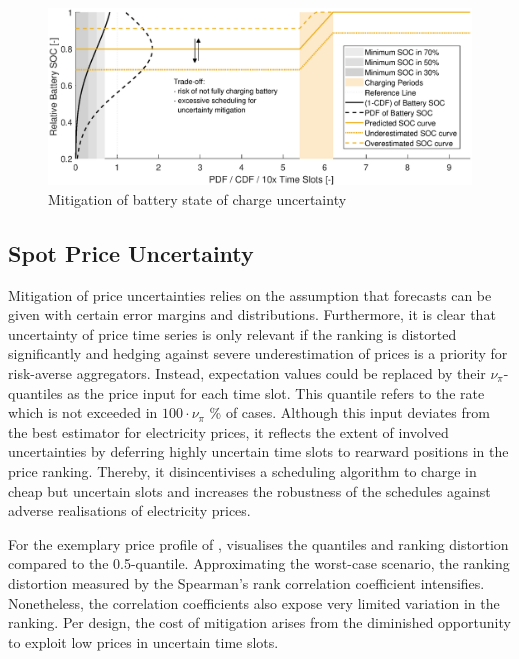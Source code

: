 \begin{figure}[]
	\includegraphics[width=\textwidth,trim={2.1cm 0cm 2.1cm 0.2cm},clip]{figures/mitigation/soc_mit.eps}
	\caption{Mitigation of battery state of charge uncertainty}
	\label{fig:soc_mit}
\end{figure}

\subsection{Spot Price Uncertainty}

Mitigation of price uncertainties relies on the assumption that forecasts can be given with certain error margins and distributions. Furthermore, it is clear that uncertainty of price time series is only relevant if the ranking is distorted significantly and hedging against severe underestimation of prices is a priority for risk-averse aggregators. Instead, expectation values could be replaced by their $\nu_{\pi}$-quantiles as the price input for each time slot. This quantile refers to the rate which is not exceeded in $100\cdot\nu_{\pi}$ \% of cases. Although this input deviates from the best estimator for electricity prices, it reflects the extent of involved uncertainties by deferring highly uncertain time slots to rearward positions in the price ranking. Thereby, it disincentivises a scheduling algorithm to charge in cheap but uncertain slots and increases the robustness of the schedules against adverse realisations of electricity prices. 

For the exemplary price profile of ,  visualises the quantiles and ranking distortion compared to the 0.5-quantile. Approximating the worst-case scenario, the ranking distortion measured by the Spearman's rank correlation coefficient intensifies. Nonetheless, the correlation coefficients also expose very limited variation in the ranking. Per design, the cost of mitigation arises from the diminished opportunity to exploit low prices in uncertain time slots.


